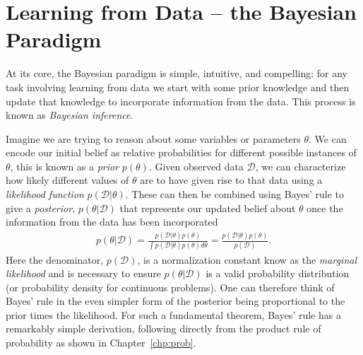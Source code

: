 
\section{Learning from Data -- the Bayesian Paradigm}
\label{sec:bayes:paradigm}

At its core, the Bayesian paradigm is simple, intuitive, and compelling: for any task involving
learning from data we start with some prior knowledge and then update that knowledge to
incorporate information from the data.  This process is known as \emph{Bayesian inference}.

Imagine we are trying to reason about some variables
or parameters $\theta$.  We can encode our initial belief as relative probabilities for different
possible instances of $\theta$, this is known as a \emph{prior} $p(\theta)$.  Given observed data
$\mathcal{D}$, we can characterize how likely different values of $\theta$ are to have given rise
to that data using a \emph{likelihood function} $p(\mathcal{D}|\theta)$.  These can then be
combined using Bayes' rule to give a \emph{posterior}, $p(\theta | \mathcal{D})$ that 
represents our updated belief about $\theta$ once the information from the data has been
incorporated
\begin{align}
	\label{eq:bayes:bayes}
	p(\theta | \mathcal{D}) = \frac{p(\mathcal{D} | \theta)p(\theta)}{\int p(\mathcal{D} | \theta)p(\theta) d\theta} 
	= \frac{p(\mathcal{D} | \theta)p(\theta)}{p(\mathcal{D})}.
\end{align}
Here the denominator, $p(\mathcal{D})$, is a normalization constant know as the \emph{marginal
	likelihood} and is necessary to ensure $p(\theta | \mathcal{D})$ is a valid probability distribution
(or probability density for continuous problems).  One can therefore think of Bayes' rule in the even
simpler form of the posterior being proportional to the prior times the likelihood.
For such a fundamental theorem, Bayes' rule has a remarkably simple derivation, following directly
from the product rule of probability as shown in Chapter~\ref{chp:prob}.

